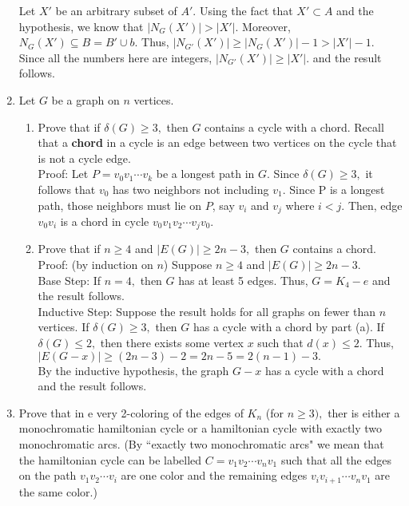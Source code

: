 \documentclass[12pt]{article}
\begin{document}
\begin{enumerate}
Let $X'$ be an arbitrary subset of $A'.$ Using the fact that $X' \subset A$ and the hypothesis, we know that $|N_{G}(X')| > |X'|.$ Moreover, $ N_{G}(X') \subseteq B = B' \cup b.$ Thus, $|N_{G'}(X')| \geq |N_{G}(X')| -1 > |X'|-1.$ Since all the numbers here are integers, $|N_{G'}(X')| \geq |X'|.
$ and the result follows.\\

\item Let $G$ be a graph on $n$ vertices.
	\begin{enumerate}
	\item Prove that if $\delta(G) \geq 3,$ then $G$ contains a cycle with a chord. Recall that a \textbf{chord} in a cycle is an edge between two vertices on the cycle that is not a cycle edge.\\
	
	Proof: Let $P=v_0v_1 \cdots v_k$ be a longest path in $G.$ Since $\delta(G) \geq 3,$ it follows that $v_0$ has two neighbors not including $v_1.$ Since P is a longest path, those neighbors must lie on $P$, say $v_i$ and $v_j$ where $i<j.$ Then, edge $v_0v_i$ is a chord in cycle $v_0v_1v_2 \cdots v_jv_0.$\\
	
	\item Prove that if $n\geq 4$ and $|E(G)| \geq 2n-3,$ then $G$ contains a chord.\\
	
	Proof: (by induction on $n$) Suppose $n\geq 4$ and $|E(G)| \geq 2n-3.$\\
	Base Step: If $n=4,$ then $G$ has at least 5 edges. Thus, $G=K_4-e$ and the result follows.\\
	Inductive Step: Suppose the result holds for all graphs on fewer than $n$ vertices.  If $\delta(G) \geq 3,$ then $G$ has a cycle with a chord by part (a). If $\delta(G) \leq 2,$ then there exists some vertex $x$ such that $d(x) \leq 2.$ Thus, $|E(G -x)| \geq (2n-3)-2=2n-5=2(n-1)-3.$ \\
	
	By the inductive hypothesis, the graph $G-x$ has a cycle with a chord and the result follows.\\
	\end{enumerate} 
	
	\item Prove that in e very 2-coloring of the edges of $K_n$ (for $n\geq 3),$ ther is either a monochromatic hamiltonian cycle or a hamiltonian cycle with exactly two monochromatic arcs. (By ``exactly two monochromatic arcs" we mean that the hamiltonian cycle can be labelled $C=v_1v_2 \cdots v_nv_1$ such that all the edges on the path $v_1v_2\cdots v_i$ are one color and the remaining edges $v_iv_{i+1} \cdots v_nv_1$ are the same color.)\\
	

\end{enumerate}
\end{document}
